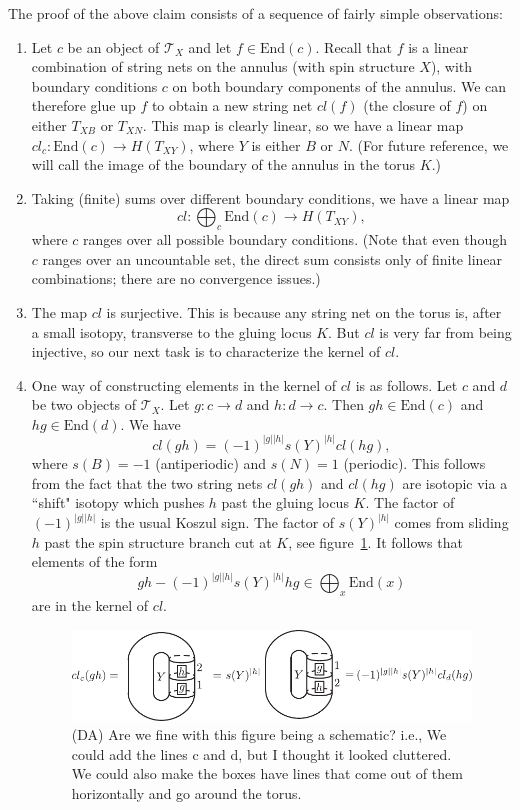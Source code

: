 \documentclass[12pt,a4paper]{article}
\newcommand{\mct}{\mathcal{T}}
\newcommand\be            {\begin{equation}}
\newcommand\ee            {\end{equation}}
\newcommand{\End}{\text{End}}
\newcommand{\dave}[1]{{\color{ao(english)}\footnotesize{(DA) #1}}}
\begin{document}
The proof of the above claim consists of a sequence of fairly simple observations:
\begin{enumerate}

\item Let $c$ be an object of $\mct_X$ and let $f\in\End(c)$.
Recall that $f$ is a linear combination of string nets on the annulus (with spin structure $X$), with boundary conditions
$c$ on both boundary components of the annulus.
We can therefore glue up $f$ to obtain a new string net $cl(f)$ (the closure of $f$) on either $T_{XB}$ or $T_{XN}$.
This map is clearly linear, so we have a linear map $cl_c : \End(c) \to H(T_{XY})$, where $Y$ is either $B$ or $N$.
(For future reference, we will call the image of the boundary of the annulus in the torus $K$.)

\item Taking (finite) sums over different boundary conditions, we have a linear map
\be
	cl : \bigoplus_c \End(c) \to H(T_{XY}) ,
\ee
where $c$ ranges over all possible boundary conditions.
(Note that even though $c$ ranges over an uncountable set, the direct sum consists only of finite linear combinations; 
there are no convergence issues.)

\item The map $cl$ is surjective.
This is because any string net on the torus is, after a small isotopy, 
transverse to the gluing locus $K$.
But $cl$ is very far from being injective, so our next task is to characterize the kernel of $cl$.

\item One way of constructing elements in the kernel of $cl$ is as follows.
Let $c$ and $d$ be two objects of $\mct_X$.
Let $g: c\to d$ and $h: d\to c$.
Then $gh \in \End(c)$ and $hg \in \End(d)$.
We have
\be
	cl(gh) = (-1)^{|g| |h|} s(Y)^{|h|} cl(hg) ,
\ee
where $s(B) = -1$ (antiperiodic) and $s(N) = 1$ (periodic).
This follows from the fact that the two string nets $cl(gh)$ and $cl(hg)$ are isotopic
via a ``shift" isotopy which pushes $h$ past the gluing locus $K$.
The factor of $(-1)^{|g| |h|}$ is the usual Koszul sign.
The factor of $s(Y)^{|h|}$ comes from sliding $h$ past the spin structure branch cut at $K$, see figure~\ref{KernalCl}.
It follows that elements of the form
\be \label{cl_ker}
	gh - (-1)^{|g| |h|} s(Y)^{|h|} hg \in \bigoplus_x \End(x)
\ee
are in the kernel of $cl$.
\begin{figure}
\begin{center}
\includegraphics{KernalCl.pdf}
\caption{\dave{Are we fine with this figure being a schematic? 
i.e., We could add the lines c and d, but I thought it looked cluttered. 
We could also make the boxes have lines that come out 
of them horizontally and go around the torus.}}
\end{center}
\label{KernalCl} 
\end{figure}


\end{enumerate}
\end{document}
